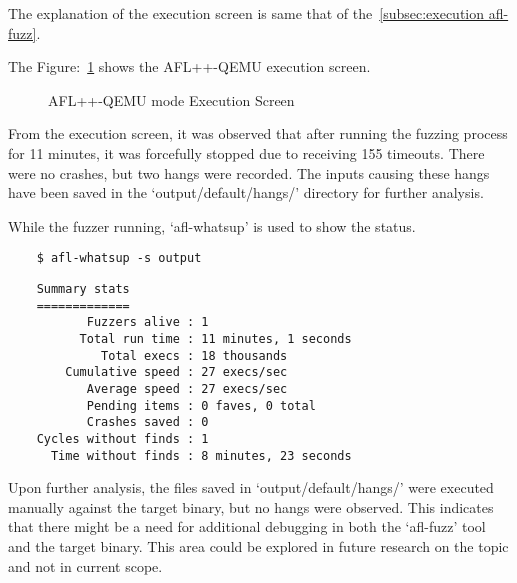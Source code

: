 The explanation of the execution screen is same that of the~\ref{subsec:execution afl-fuzz}.

The Figure:~\ref{fig:afl_execute_qemu} shows the AFL++-QEMU execution screen.
\begin{figure}[H]
        \caption{AFL++-QEMU mode Execution Screen}\label{fig:afl_execute_qemu}
\end{figure}


From the execution screen, it was observed that after running the fuzzing
process for 11 minutes, it was forcefully stopped due to receiving 155 timeouts.
There were no crashes, but two hangs were recorded. The inputs causing these
hangs have been saved in the `output/default/hangs/' directory for further
analysis.

While the fuzzer running, `afl-whatsup' is used to show the status.

\begin{verbatim}
    $ afl-whatsup -s output
\end{verbatim}

\begin{verbatim}
    Summary stats
    =============
           Fuzzers alive : 1
          Total run time : 11 minutes, 1 seconds
             Total execs : 18 thousands
        Cumulative speed : 27 execs/sec
           Average speed : 27 execs/sec
           Pending items : 0 faves, 0 total
           Crashes saved : 0
    Cycles without finds : 1
      Time without finds : 8 minutes, 23 seconds
\end{verbatim}

Upon further analysis, the files saved in `output/default/hangs/' were executed
manually against the target binary, but no hangs were observed. This indicates
that there might be a need for additional debugging in both the `afl-fuzz' tool
and the target binary. This area could be explored in future research on the topic
and not in current scope.

\clearpage